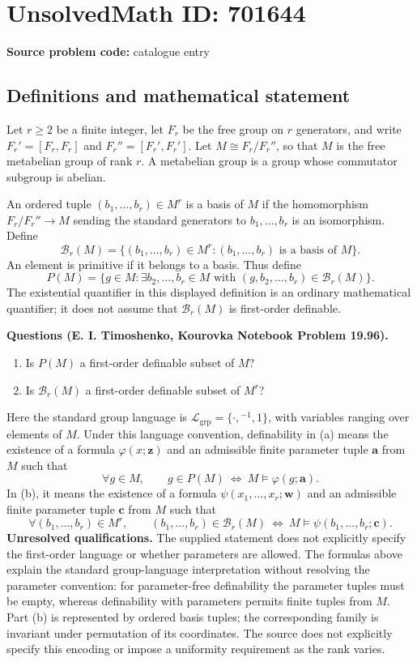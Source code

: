 \documentclass[11pt]{article}
\begin{document}
\section*{UnsolvedMath ID: 701644}
\textbf{Source problem code:} catalogue entry
\subsection{Definitions and mathematical statement}
Let \(r\geq 2\) be a finite integer, let \(F_r\) be the free group on \(r\) generators, and write \(F_r'=[F_r,F_r]\) and \(F_r''=[F_r',F_r']\). Let \(M\cong F_r/F_r''\), so that \(M\) is the free metabelian group of rank \(r\). A metabelian group is a group whose commutator subgroup is abelian.

An ordered tuple \((b_1,\ldots,b_r)\in M^r\) is a basis of \(M\) if the homomorphism \(F_r/F_r''\to M\) sending the standard generators to \(b_1,\ldots,b_r\) is an isomorphism. Define
\[
\mathcal B_r(M)=\{(b_1,\ldots,b_r)\in M^r:(b_1,\ldots,b_r)\text{ is a basis of }M\}.
\]
An element is primitive if it belongs to a basis. Thus define
\[
P(M)=\{g\in M:\exists b_2,\ldots,b_r\in M\text{ with }(g,b_2,\ldots,b_r)\in\mathcal B_r(M)\}.
\]
The existential quantifier in this displayed definition is an ordinary mathematical quantifier; it does not assume that \(\mathcal B_r(M)\) is first-order definable.

\textbf{Questions (E. I. Timoshenko, Kourovka Notebook Problem 19.96).}
\begin{enumerate}
\item[(a)] Is \(P(M)\) a first-order definable subset of \(M\)?
\item[(b)] Is \(\mathcal B_r(M)\) a first-order definable subset of \(M^r\)?
\end{enumerate}
Here the standard group language is \(\mathcal L_{\mathrm{grp}}=\{\cdot,{}^{-1},1\}\), with variables ranging over elements of \(M\). Under this language convention, definability in (a) means the existence of a formula \(\varphi(x;\mathbf z)\) and an admissible finite parameter tuple \(\mathbf a\) from \(M\) such that
\[
\forall g\in M,\qquad g\in P(M)\ \Longleftrightarrow\ M\models\varphi(g;\mathbf a).
\]
In (b), it means the existence of a formula \(\psi(x_1,\ldots,x_r;\mathbf w)\) and an admissible finite parameter tuple \(\mathbf c\) from \(M\) such that
\[
\forall(b_1,\ldots,b_r)\in M^r,\qquad
(b_1,\ldots,b_r)\in\mathcal B_r(M)
\ \Longleftrightarrow\ M\models\psi(b_1,\ldots,b_r;\mathbf c).
\]
\textbf{Unresolved qualifications.} The supplied statement does not explicitly specify the first-order language or whether parameters are allowed. The formulas above explain the standard group-language interpretation without resolving the parameter convention: for parameter-free definability the parameter tuples must be empty, whereas definability with parameters permits finite tuples from \(M\). Part (b) is represented by ordered basis tuples; the corresponding family is invariant under permutation of its coordinates. The source does not explicitly specify this encoding or impose a uniformity requirement as the rank varies.
\end{document}
